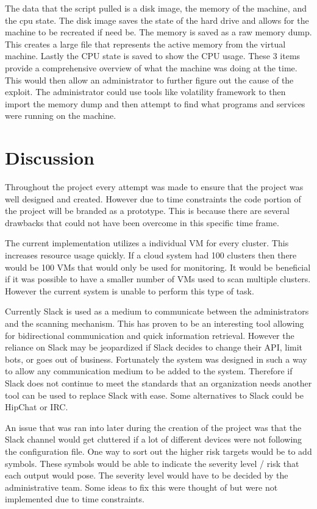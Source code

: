 \documentclass[12pt]{article}
\begin{document}
The data that the script pulled is a disk image, the memory of the machine, and the cpu state. The disk image saves the state of the hard drive and allows for the machine to be recreated if need be. The memory is saved as a raw memory dump. This creates a large file that represents the active memory from the virtual machine. Lastly the CPU state is saved to show the CPU usage. These 3 items provide a comprehensive overview of what the machine was doing at the time. This would then allow an administrator to further figure out the cause of the exploit. The administrator could use tools like volatility framework \cite{volitilityFram} to then import the memory dump and then attempt to find what programs and services were running on the machine.

\section{Discussion}
Throughout the project every attempt was made to ensure that the project was well designed and created. However due to time constraints the code portion of the project will be branded as a prototype. This is because there are several drawbacks that could not have been overcome in this specific time frame.

The current implementation utilizes a individual VM for every cluster. This increases resource usage quickly. If a cloud system had 100 clusters then there would be 100 VMs that would only be used for monitoring. It would be beneficial if it was possible to have a smaller number of VMs used to scan multiple clusters. However the current system is unable to perform this type of task.

Currently Slack is used as a medium to communicate between the administrators and the scanning mechanism. This has proven to be an interesting tool allowing for bidirectional communication and quick information retrieval. However the reliance on Slack may be jeopardized if Slack decides to change their API, limit bots, or goes out of business. Fortunately the system was designed in such a way to allow any communication medium to be added to the system. Therefore if Slack does not continue to meet the standards that an organization needs another tool can be used to replace Slack with ease. Some alternatives to Slack could be HipChat or IRC.

An issue that was ran into later during the creation of the project was that the Slack channel would get cluttered if a lot of different devices were not following the configuration file. One way to sort out the higher risk targets would be to add symbols. These symbols would be able to indicate the severity level / risk that each output would pose. The severity level would have to be decided by the administrative team. Some ideas to fix this were thought of but were not implemented due to time constraints.
\end{document}
